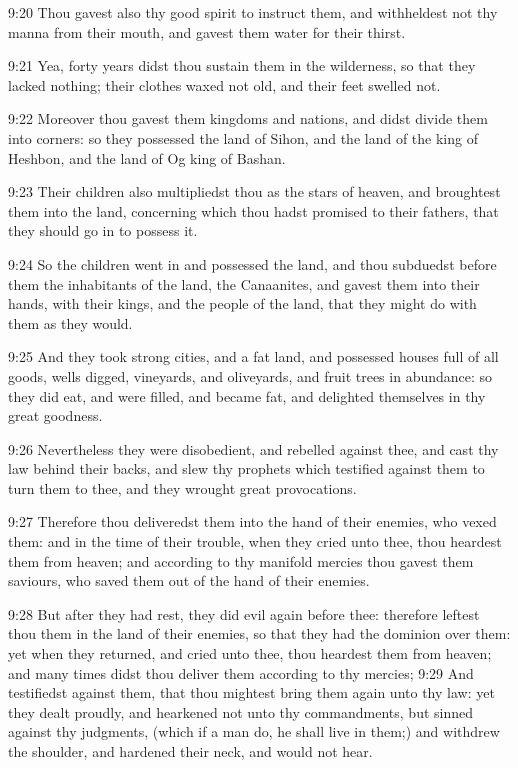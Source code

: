 9:20 Thou gavest also thy good spirit to instruct them, and withheldest not thy manna from their mouth, and gavest them water for their thirst.

9:21 Yea, forty years didst thou sustain them in the wilderness, so that they lacked nothing; their clothes waxed not old, and their feet swelled not.

9:22 Moreover thou gavest them kingdoms and nations, and didst divide them into corners: so they possessed the land of Sihon, and the land of the king of Heshbon, and the land of Og king of Bashan.

9:23 Their children also multipliedst thou as the stars of heaven, and broughtest them into the land, concerning which thou hadst promised to their fathers, that they should go in to possess it.

9:24 So the children went in and possessed the land, and thou subduedst before them the inhabitants of the land, the Canaanites, and gavest them into their hands, with their kings, and the people of the land, that they might do with them as they would.

9:25 And they took strong cities, and a fat land, and possessed houses full of all goods, wells digged, vineyards, and oliveyards, and fruit trees in abundance: so they did eat, and were filled, and became fat, and delighted themselves in thy great goodness.

9:26 Nevertheless they were disobedient, and rebelled against thee, and cast thy law behind their backs, and slew thy prophets which testified against them to turn them to thee, and they wrought great provocations.

9:27 Therefore thou deliveredst them into the hand of their enemies, who vexed them: and in the time of their trouble, when they cried unto thee, thou heardest them from heaven; and according to thy manifold mercies thou gavest them saviours, who saved them out of the hand of their enemies.

9:28 But after they had rest, they did evil again before thee: therefore leftest thou them in the land of their enemies, so that they had the dominion over them: yet when they returned, and cried unto thee, thou heardest them from heaven; and many times didst thou deliver them according to thy mercies; 9:29 And testifiedst against them, that thou mightest bring them again unto thy law: yet they dealt proudly, and hearkened not unto thy commandments, but sinned against thy judgments, (which if a man do, he shall live in them;) and withdrew the shoulder, and hardened their neck, and would not hear.

